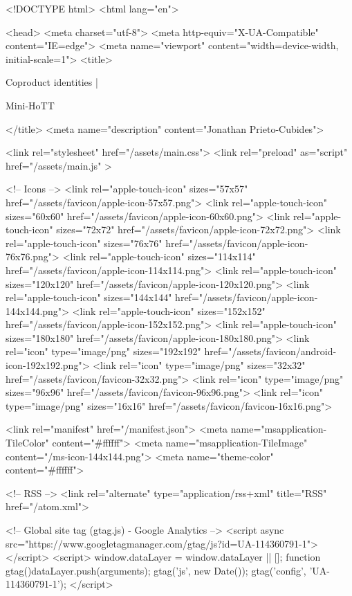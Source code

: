 <!DOCTYPE html>
<html lang="en">

<head>
  <meta charset="utf-8">
  <meta http-equiv="X-UA-Compatible" content="IE=edge">
  <meta name="viewport" content="width=device-width, initial-scale=1">
  <title>
    
      
        Coproduct identities |
      
        Mini-HoTT
    
  </title>
  <meta name="description" content="Jonathan Prieto-Cubides">

  <link rel="stylesheet" href="/assets/main.css">
  <link rel="preload" as="script" href="/assets/main.js" >

  <!-- Icons -->
  <link rel="apple-touch-icon" sizes="57x57" href="/assets/favicon/apple-icon-57x57.png">
  <link rel="apple-touch-icon" sizes="60x60" href="/assets/favicon/apple-icon-60x60.png">
  <link rel="apple-touch-icon" sizes="72x72" href="/assets/favicon/apple-icon-72x72.png">
  <link rel="apple-touch-icon" sizes="76x76" href="/assets/favicon/apple-icon-76x76.png">
  <link rel="apple-touch-icon" sizes="114x114" href="/assets/favicon/apple-icon-114x114.png">
  <link rel="apple-touch-icon" sizes="120x120" href="/assets/favicon/apple-icon-120x120.png">
  <link rel="apple-touch-icon" sizes="144x144" href="/assets/favicon/apple-icon-144x144.png">
  <link rel="apple-touch-icon" sizes="152x152" href="/assets/favicon/apple-icon-152x152.png">
  <link rel="apple-touch-icon" sizes="180x180" href="/assets/favicon/apple-icon-180x180.png">
  <link rel="icon" type="image/png" sizes="192x192"  href="/assets/favicon/android-icon-192x192.png">
  <link rel="icon" type="image/png" sizes="32x32" href="/assets/favicon/favicon-32x32.png">
  <link rel="icon" type="image/png" sizes="96x96" href="/assets/favicon/favicon-96x96.png">
  <link rel="icon" type="image/png" sizes="16x16" href="/assets/favicon/favicon-16x16.png">

  <link rel="manifest" href="/manifest.json">
  <meta name="msapplication-TileColor" content="#ffffff">
  <meta name="msapplication-TileImage" content="/ms-icon-144x144.png">
  <meta name="theme-color" content="#ffffff">

  <!-- RSS -->
  <link rel="alternate" type="application/rss+xml" title="RSS" href="/atom.xml">

  <!-- Global site tag (gtag.js) - Google Analytics -->
  <script async src="https://www.googletagmanager.com/gtag/js?id=UA-114360791-1"></script>
  <script>
    window.dataLayer = window.dataLayer || [];
    function gtag(){dataLayer.push(arguments);}
    gtag('js', new Date());
    gtag('config', 'UA-114360791-1');
  </script>

